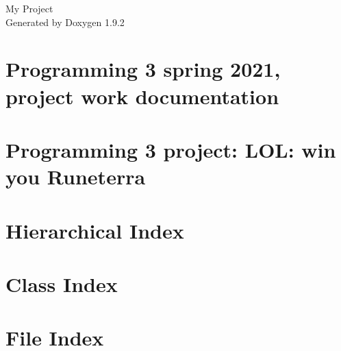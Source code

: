 \documentclass[twoside]{book}
\newcommand{\+}{\discretionary{\mbox{\scriptsize$\hookleftarrow$}}{}{}}
\newcommand{\clearemptydoublepage}{%
    \newpage{\pagestyle{empty}\cleardoublepage}%
  }
\begin{document}
  \raggedbottom
    \hypersetup{pageanchor=false,
                bookmarksnumbered=true,
                pdfencoding=unicode
               }
  \begin{titlepage}
  \vspace*{7cm}
  \begin{center}%
  {\Large My Project}\\
  \vspace*{1cm}
  {\large Generated by Doxygen 1.9.2}\\
  \end{center}
  \end{titlepage}
  \clearemptydoublepage
  \tableofcontents
  \clearemptydoublepage
  \hypersetup{pageanchor=true}
\chapter{Programming 3 spring 2021, project work documentation}
\label{index}\hypertarget{index}{}
\chapter{Programming 3 project\+: LOL\+: win you Runeterra}
\label{md__home_theanh_Documents_programming_3_nhi_and_anh_README}

\chapter{Hierarchical Index}

\chapter{Class Index}

\chapter{File Index}

\end{document}
